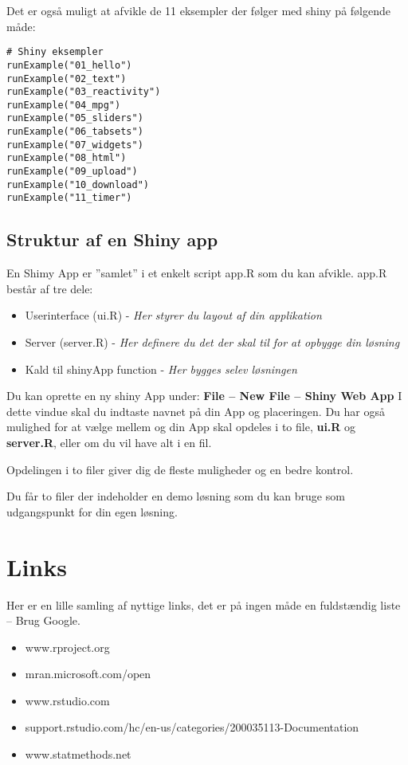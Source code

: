\documentclass[
]{book}
\providecommand{\tightlist}{%
  \setlength{\itemsep}{0pt}\setlength{\parskip}{0pt}}
\begin{document}
Det er også muligt at afvikle de 11 eksempler der følger med shiny på følgende måde:

\begin{verbatim}
# Shiny eksempler
runExample("01_hello")
runExample("02_text")
runExample("03_reactivity")
runExample("04_mpg")
runExample("05_sliders")
runExample("06_tabsets")
runExample("07_widgets")
runExample("08_html")
runExample("09_upload")
runExample("10_download")
runExample("11_timer")
\end{verbatim}

\hypertarget{struktur-af-en-shiny-app}{%
\section{Struktur af en Shiny app}\label{struktur-af-en-shiny-app}}

En Shimy App er ''samlet'' i et enkelt script app.R som du kan afvikle.
app.R består af tre dele:

\begin{itemize}
\tightlist
\item
  Userinterface (ui.R) - \emph{Her styrer du layout af din applikation}
\item
  Server (server.R) - \emph{Her definere du det der skal til for at opbygge din løsning}
\item
  Kald til shinyApp function - \emph{Her bygges selev løsningen}
\end{itemize}

Du kan oprette en ny shiny App under:
\textbf{File -- New File -- Shiny Web App}
I dette vindue skal du indtaste navnet på din App og placeringen. Du har også mulighed for at vælge mellem og din App skal opdeles i to file, \textbf{ui.R} og \textbf{server.R}, eller om du vil have alt i en fil.

Opdelingen i to filer giver dig de fleste muligheder og en bedre kontrol.

Du får to filer der indeholder en demo løsning som du kan bruge som
udgangspunkt for din egen løsning.

\hypertarget{links}{%
\chapter{Links}\label{links}}

Her er en lille samling af nyttige links, det er på ingen måde en fuldstændig liste -- Brug Google.

\begin{itemize}
\tightlist
\item
  www.rproject.org
\item
  mran.microsoft.com/open
\item
  www.rstudio.com
\item
  support.rstudio.com/hc/en-us/categories/200035113-Documentation
\item
  www.statmethods.net
\end{itemize}

  
\end{document}
